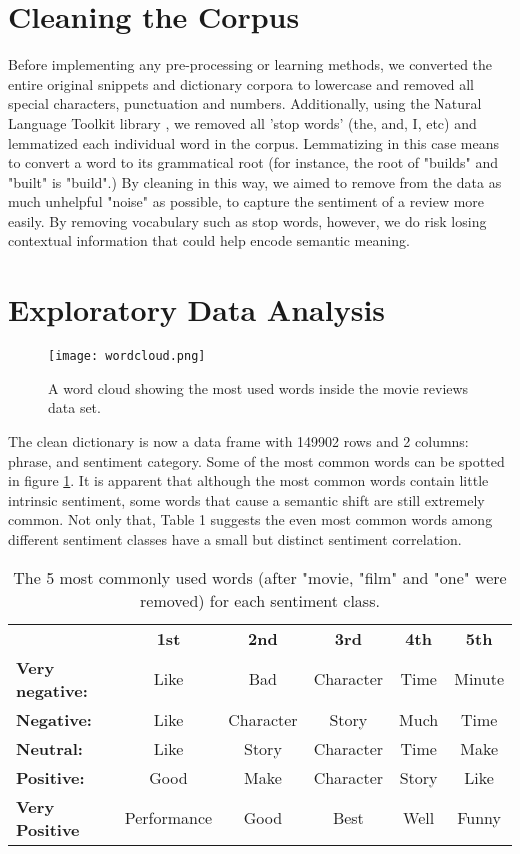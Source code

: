 \documentclass{article}
\begin{document}
\section{Cleaning the Corpus}
Before implementing any pre-processing or learning methods, we converted the entire original snippets and dictionary corpora to lowercase and removed all special characters, punctuation and numbers. Additionally, using the Natural Language Toolkit library \cite{rehurek_lrec}, we removed all 'stop words' (the, and, I, etc) and lemmatized each individual word in the corpus. Lemmatizing in this case means to convert a word to its grammatical root (for instance, the root of "builds" and "built" is "build".) By cleaning in this way, we aimed to remove from the data as much unhelpful "noise" as possible, to capture the sentiment of a review more easily. By removing vocabulary such as stop words, however, we do risk losing contextual information that could help encode semantic meaning.
\section{Exploratory Data Analysis}
\begin{figure}[!ht]
    \centering
    \texttt{[image: wordcloud.png]}
    \caption{ A word cloud showing the most used words inside the movie reviews data set. }
    \label{fig:word_cloud}
\end{figure}
The clean dictionary is now a data frame with 149902 rows and 2 columns: phrase, and sentiment category. Some of the most common words can be spotted in figure \ref{fig:word_cloud}. It is apparent that although the most common words contain little intrinsic sentiment, some words that cause a semantic shift are still extremely common. Not only that, Table 1 suggests the even most common words among different sentiment classes have a small but distinct sentiment correlation.
\begin{table}[!ht]
\centering
\begin{tabular}{lccccc}
\quad  & \textbf{1st} & \textbf{2nd} & \textbf{3rd} & \textbf{4th} & \textbf{5th} \\
\textbf{Very negative:} & Like                 & Bad                  & Character            & Time                 & Minute               \\
\textbf{Negative:}      & Like                 & Character            & Story                & Much                 & Time                 \\
\textbf{Neutral:}       & Like                 & Story                & Character            & Time                 & Make                 \\
\textbf{Positive:}       & Good                 & Make                 & Character            & Story                & Like                 \\
\textbf{Very Positive}   & Performance          & Good                 & Best                 & Well                 & Funny               
\end{tabular}
\caption{The 5 most commonly used words (after "movie, "film" and "one" were removed) for each sentiment class.}
\label{word_table}
\end{table}
\end{document}
